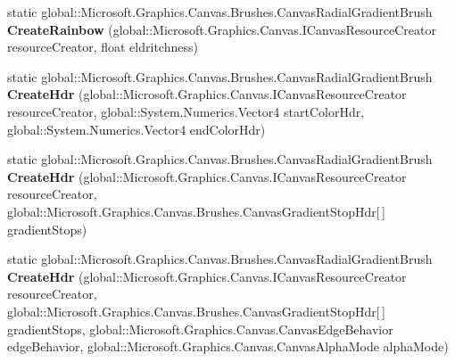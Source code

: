 \begin{DoxyCompactItemize}
\item 
\mbox{\label{class_microsoft_1_1_graphics_1_1_canvas_1_1_brushes_1_1_canvas_radial_gradient_brush_a19932ca8ae9416ca37a762c1184257db}} 
static global\+::\+Microsoft.\+Graphics.\+Canvas.\+Brushes.\+Canvas\+Radial\+Gradient\+Brush {\bfseries Create\+Rainbow} (global\+::\+Microsoft.\+Graphics.\+Canvas.\+I\+Canvas\+Resource\+Creator resource\+Creator, float eldritchness)
\item 
\mbox{\label{class_microsoft_1_1_graphics_1_1_canvas_1_1_brushes_1_1_canvas_radial_gradient_brush_a9fc3b8b39e6337c070642178c6fb106c}} 
static global\+::\+Microsoft.\+Graphics.\+Canvas.\+Brushes.\+Canvas\+Radial\+Gradient\+Brush {\bfseries Create\+Hdr} (global\+::\+Microsoft.\+Graphics.\+Canvas.\+I\+Canvas\+Resource\+Creator resource\+Creator, global\+::\+System.\+Numerics.\+Vector4 start\+Color\+Hdr, global\+::\+System.\+Numerics.\+Vector4 end\+Color\+Hdr)
\item 
\mbox{\label{class_microsoft_1_1_graphics_1_1_canvas_1_1_brushes_1_1_canvas_radial_gradient_brush_aef0da396142c3d6724253585940535e0}} 
static global\+::\+Microsoft.\+Graphics.\+Canvas.\+Brushes.\+Canvas\+Radial\+Gradient\+Brush {\bfseries Create\+Hdr} (global\+::\+Microsoft.\+Graphics.\+Canvas.\+I\+Canvas\+Resource\+Creator resource\+Creator, global\+::\+Microsoft.\+Graphics.\+Canvas.\+Brushes.\+Canvas\+Gradient\+Stop\+Hdr\mbox{[}$\,$\mbox{]} gradient\+Stops)
\item 
\mbox{\label{class_microsoft_1_1_graphics_1_1_canvas_1_1_brushes_1_1_canvas_radial_gradient_brush_a56c87e8ee5b2516dfc061d3207cbba62}} 
static global\+::\+Microsoft.\+Graphics.\+Canvas.\+Brushes.\+Canvas\+Radial\+Gradient\+Brush {\bfseries Create\+Hdr} (global\+::\+Microsoft.\+Graphics.\+Canvas.\+I\+Canvas\+Resource\+Creator resource\+Creator, global\+::\+Microsoft.\+Graphics.\+Canvas.\+Brushes.\+Canvas\+Gradient\+Stop\+Hdr\mbox{[}$\,$\mbox{]} gradient\+Stops, global\+::\+Microsoft.\+Graphics.\+Canvas.\+Canvas\+Edge\+Behavior edge\+Behavior, global\+::\+Microsoft.\+Graphics.\+Canvas.\+Canvas\+Alpha\+Mode alpha\+Mode)

\end{DoxyCompactItemize}
